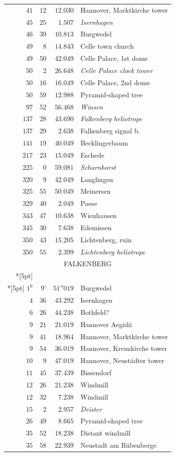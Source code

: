 \begin{longtable}{@{}rrrp{.61\linewidth}@{}}
\(41\)&\(12\)&\(12.030\)&\raggedright Hannover, Marktkirche tower\tabularnewline
\(45\)&\(25\)&\(1.507\)&\raggedright \textit{Isernhagen}\tabularnewline
\(46\)&\(39\)&\(10.813\)&\raggedright Burgwedel\tabularnewline
\(49\)&\(8\)&\(14.843\)&\raggedright Celle town church\tabularnewline
\(49\)&\(50\)&\(42.049\)&\raggedright Celle Palace, 1st dome\tabularnewline
\(50\)&\(2\)&\(26.648\)&\raggedright \textit{Celle Palace clock tower}\tabularnewline
\(50\)&\(16\)&\(16.049\)&\raggedright Celle Palace, 2nd dome\tabularnewline
\(50\)&\(59\)&\(12.988\)&\raggedright Pyramid-shaped tree\tabularnewline
\(97\)&\(52\)&\(56.468\)&\raggedright \textit{Winsen}\tabularnewline
\(137\)&\(28\)&\(43.690\)&\raggedright \textit{Falkenberg heliotrope}\tabularnewline
\(137\)&\(29\)&\(2.638\)&\raggedright Falkenberg signal b.\tabularnewline
\(141\)&\(19\)&\(40.049\)&\raggedright Becklingerbaum\tabularnewline
\(217\)&\(23\)&\(15.049\)&\raggedright Eschede\tabularnewline
\(225\)&\(0\)&\(59.081\)&\raggedright \textit{Scharnhorst}\tabularnewline
\(320\)&\(9\)&\(42.049\)&\raggedright Langlingen\tabularnewline
\(325\)&\(55\)&\(50.049\)&\raggedright Meinersen\tabularnewline
\(329\)&\(40\)&\(2.049\)&\raggedright Paese\tabularnewline
\(343\)&\(47\)&\(10.638\)&\raggedright Wienhausen\tabularnewline
\(345\)&\(30\)&\(7.638\)&\raggedright Edemissen\tabularnewline
\(350\)&\(43\)&\(15.205\)&\raggedright Lichtenberg, ruin\tabularnewline
\(350\)&\(55\)&\(2.399\)&\raggedright \textit{Lichtenberg heliotrope}\tabularnewline
\multicolumn{4}{c}{\strut FALKENBERG}\\*[5pt]
\multicolumn{4}{c}{\(-146621.040\)\qquad\(+5142.567\)}\\*[5pt]
\(1^{0}\)&\(9'\)&\(51''019\)&\raggedright Burgwedel\tabularnewline
\(4\)&\(36\)&\(43.292\)&\raggedright Isernhagen\tabularnewline
\(6\)&\(26\)&\(44.238\)&\raggedright Bothfeld?\tabularnewline
\(9\)&\(21\)&\(21.019\)&\raggedright Hannover Aegidii\tabularnewline
\(9\)&\(41\)&\(18.964\)&\raggedright Hannover, Marktkirche tower\tabularnewline
\(9\)&\(54\)&\(36.019\)&\raggedright Hannover, Kreuzkirche tower\tabularnewline
\(10\)&\(9\)&\(47.019\)&\raggedright Hannover, Neustädter tower\tabularnewline
\(11\)&\(45\)&\(37.439\)&\raggedright Bissendorf\tabularnewline
\(12\)&\(26\)&\(21.238\)&\raggedright Windmill\tabularnewline
\(12\)&\(32\)&\(7.238\)&\raggedright Windmill\tabularnewline
\(15\)&\(2\)&\(2.957\)&\raggedright \textit{Deister}\tabularnewline
\(26\)&\(49\)&\(8.665\)&\raggedright Pyramid-shaped tree\tabularnewline
\(35\)&\(52\)&\(18.238\)&\raggedright Distant windmill\tabularnewline
\(35\)&\(58\)&\(22.939\)&\raggedright Neustadt am Rübenberge\tabularnewline

\end{longtable}
